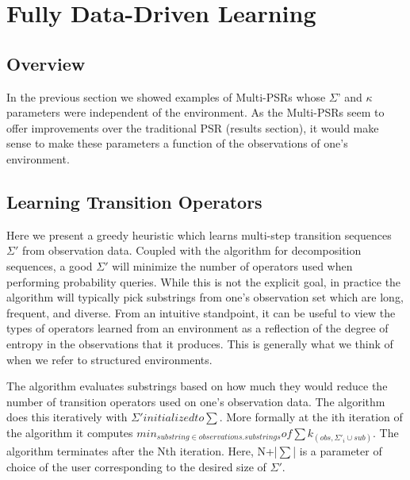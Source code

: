 \section{Fully Data-Driven Learning}

\subsection{Overview}

In the previous section we showed examples of Multi-PSRs whose $\Sigma$' and $\kappa$ parameters were independent of the environment. As the Multi-PSRs seem to offer improvements over the traditional PSR (results section), it would make sense to make these parameters a function of the observations of one's environment. 

\subsection{Learning Transition Operators}

Here we present a greedy heuristic which learns multi-step transition sequences $\Sigma'$ from observation data. Coupled with the algorithm for decomposition sequences, a good $\Sigma'$ will minimize the number of operators used when performing probability queries. While this is not the explicit goal, in practice the algorithm will typically pick substrings from one's observation set which are long, frequent, and diverse. From an intuitive standpoint, it can be useful to view the types of operators learned from an environment as a reflection of the degree of entropy in the observations that it produces. This is generally what we think of when we refer to structured environments.

The algorithm evaluates substrings based on how much they would reduce the number of transition operators used on one's observation data. The algorithm does this iteratively with $\Sigma' initialized to \sum$. More formally at the ith iteration of the algorithm it computes $min_{substring \in observations.substrings} of \sum k_(obs,\Sigma'_i \cup sub)$. The algorithm terminates after the Nth iteration. Here, N+|$\sum$| is a parameter of choice of the user corresponding to the desired size of $\Sigma'$.

